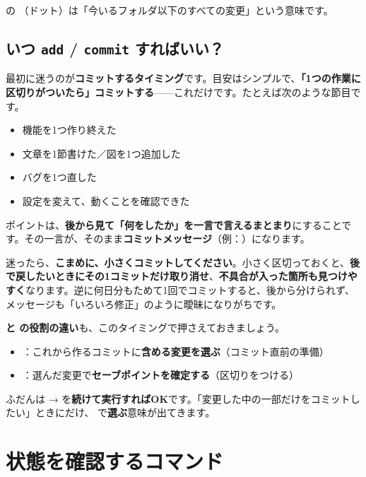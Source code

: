  の （ドット）は「今いるフォルダ以下のすべての変更」という意味です。

\subsection{いつ \texttt{add} / \texttt{commit} すればいい？}

最初に迷うのが\textbf{コミットするタイミング}です。目安はシンプルで、\textbf{「1つの作業に区切りがついたら」コミットする}——これだけです。たとえば次のような節目です。

\begin{itemize}[leftmargin=1.4em]
  \item 機能を1つ作り終えた
  \item 文章を1節書けた／図を1つ追加した
  \item バグを1つ直した
  \item 設定を変えて、動くことを確認できた
\end{itemize}

ポイントは、\textbf{後から見て「何をしたか」を一言で言えるまとまり}にすることです。その一言が、そのまま\textbf{コミットメッセージ}（例：）になります。

迷ったら、\textbf{こまめに、小さくコミットしてください}。小さく区切っておくと、\textbf{後で戻したいときにその1コミットだけ取り消せ}、\textbf{不具合が入った箇所も見つけやすく}なります。逆に何日分もためて1回でコミットすると、後から分けられず、メッセージも「いろいろ修正」のように曖昧になりがちです。

\textbf{ と  の役割の違い}も、このタイミングで押さえておきましょう。

\begin{itemize}[leftmargin=1.4em]
  \item {}：これから作るコミットに\textbf{含める変更を選ぶ}（コミット直前の準備）
  \item {}：選んだ変更で\textbf{セーブポイントを確定する}（区切りをつける）
\end{itemize}

ふだんは  →  を\textbf{続けて実行すればOK}です。「変更した中の一部だけをコミットしたい」ときにだけ、 で\textbf{選ぶ}意味が出てきます。

\section{状態を確認するコマンド}

